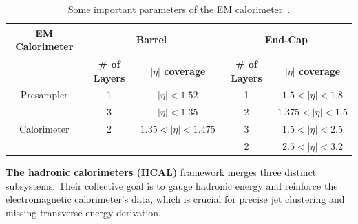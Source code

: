 \begin{table}[!htbp]
    \small
    \centering
    \begin{tabular}{c|c|c|c|c}
        \hline\hline
        \textbf{EM Calorimeter} & \multicolumn{2}{c|}{\textbf{Barrel}} &\multicolumn{2}{c}{\textbf{End-Cap}} \\
        \hline
         & \textbf{\# of Layers} & \textbf{$|\eta|$ coverage} & \textbf{\# of Layers} & \textbf{$|\eta|$ coverage} \\
         \hline
         Presampler & 1 & $|\eta|<1.52$ & 1 & $1.5<|\eta|<1.8$ \\
         \hline
         \multirow{3}{*}{Calorimeter} & 3 & $|\eta|<1.35$ & 2 & $1.375<|\eta|<1.5$ \\
         & 2 & $1.35<|\eta|<1.475$ & 3 & $1.5<|\eta|<2.5$ \\
         & & & 2 & $2.5<|\eta|<3.2$ \\
        \hline\hline
    \end{tabular}
    \caption{Some important parameters of the EM calorimeter~\cite{ATLAS-TDR-04}.}
    \label{tab:EMCal_parameters}
\end{table}

\textbf{The hadronic calorimeters (HCAL)} framework merges three distinct subsystems. Their collective goal is to gauge hadronic energy and reinforce the electromagnetic calorimeter's data, which is crucial for precise jet clustering and missing transverse energy derivation.

